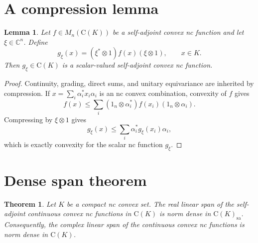 \documentclass[11pt]{article}
\newtheorem{theorem}{Theorem}
\newtheorem{lemma}{Lemma}
\newcommand{\CK}{\mathrm{C}(K)}
\newcommand{\Mn}{M_n}
\newcommand{\sa}{\mathrm{sa}}
\begin{document}
\section{A compression lemma}

\begin{lemma}\label{lem:compression}
Let \(f\in \Mn(\CK)\) be a self-adjoint convex nc function and let
\(\xi\in \mathbb{C}^n\).  Define
\[
g_\xi(x)=(\xi^*\otimes 1)f(x)(\xi\otimes 1),\qquad x\in K.
\]
Then \(g_\xi\in \CK\) is a scalar-valued self-adjoint convex nc function.
\end{lemma}

\begin{proof}
Continuity, grading, direct sums, and unitary equivariance are inherited by
compression.  If \(x=\sum_i \alpha_i^*x_i\alpha_i\) is an nc convex
combination, convexity of \(f\) gives
\[
f(x)\le \sum_i (1_n\otimes\alpha_i^*)f(x_i)(1_n\otimes\alpha_i).
\]
Compressing by \(\xi\otimes 1\) gives
\[
g_\xi(x)\le \sum_i \alpha_i^*g_\xi(x_i)\alpha_i,
\]
which is exactly convexity for the scalar nc function \(g_\xi\).
\end{proof}

\section{Dense span theorem}

\begin{theorem}\label{thm:dense}
Let \(K\) be a compact nc convex set.  The real linear span of the
self-adjoint continuous convex nc functions in \(\CK\) is norm dense in
\(\CK_{\sa}\).  Consequently, the complex linear span of the continuous convex
nc functions is norm dense in \(\CK\).
\end{theorem}
\end{document}
